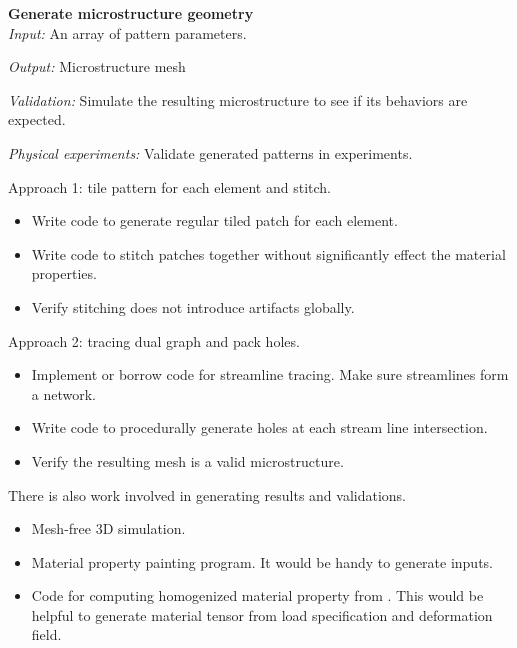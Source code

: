 \begin{description}
\item{\bf Generate microstructure geometry}\\
{\it Input:} An array of pattern parameters.

{\it Output:} Microstructure mesh

{\it Validation:} Simulate the resulting microstructure to see if its behaviors
are expected.

{\it Physical experiments:} Validate generated patterns in experiments.

Approach 1: tile pattern for each element and stitch.
\begin{itemize}
\item Write code to generate regular tiled patch for each element.
\item Write code to stitch patches together without significantly effect the material
properties.
\item Verify stitching does not introduce artifacts globally.
\end{itemize}

Approach 2: tracing dual graph and pack holes.
\begin{itemize}
\item Implement or borrow code for streamline tracing.  Make sure streamlines
form a network.
\item Write code to procedurally generate holes at each stream line
intersection.
\item Verify the resulting mesh is a valid microstructure.
\end{itemize}
\end{description}



There is also work involved in generating results and validations.
\begin{itemize}
\item Mesh-free 3D simulation.
\item Material property painting program.  It would be handy to generate
inputs.
\item Code for computing homogenized material property from
\cite{Kharevych2009}.  This would be helpful to generate material tensor from
load specification and deformation field.
\end{itemize}



